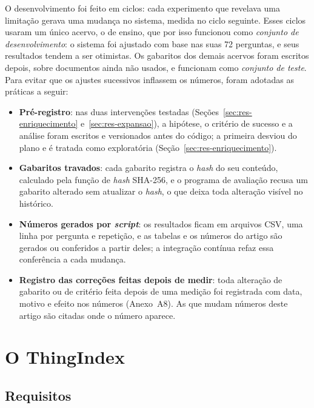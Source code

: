 \documentclass[12pt]{article}
\begin{document}
O desenvolvimento foi feito em ciclos: cada experimento que revelava uma limitação gerava uma mudança no sistema, medida no ciclo seguinte. Esses ciclos usaram um único acervo, o de ensino, que por isso funcionou como \emph{conjunto de desenvolvimento}: o sistema foi ajustado com base nas suas 72 perguntas, e seus resultados tendem a ser otimistas. Os gabaritos dos demais acervos foram escritos depois, sobre documentos ainda não usados, e funcionam como \emph{conjunto de teste}. Para evitar que os ajustes sucessivos inflassem os números, foram adotadas as práticas a seguir:
\begin{itemize}
  \item \textbf{Pré-registro}: nas duas intervenções testadas (Seções~\ref{sec:res-enriquecimento} e~\ref{sec:res-expansao}), a hipótese, o critério de sucesso e a análise foram escritos e versionados antes do código; a primeira desviou do plano e é tratada como exploratória (Seção~\ref{sec:res-enriquecimento}).
  \item \textbf{Gabaritos travados}: cada gabarito registra o \emph{hash} do seu conteúdo, calculado pela função de \emph{hash} SHA-256, e o programa de avaliação recusa um gabarito alterado sem atualizar o \emph{hash}, o que deixa toda alteração visível no histórico.
  \item \textbf{Números gerados por \emph{script}}: os resultados ficam em arquivos CSV, uma linha por pergunta e repetição, e as tabelas e os números do artigo são gerados ou conferidos a partir deles; a integração contínua refaz essa conferência a cada mudança.
  \item \textbf{Registro das correções feitas depois de medir}: toda alteração de gabarito ou de critério feita depois de uma medição foi registrada com data, motivo e efeito nos números (Anexo~A8). As que mudam números deste artigo são citadas onde o número aparece.
\end{itemize}

\section{O ThingIndex}
\label{sec:artefato}

\subsection{Requisitos}
\label{sec:requisitos}
\end{document}
